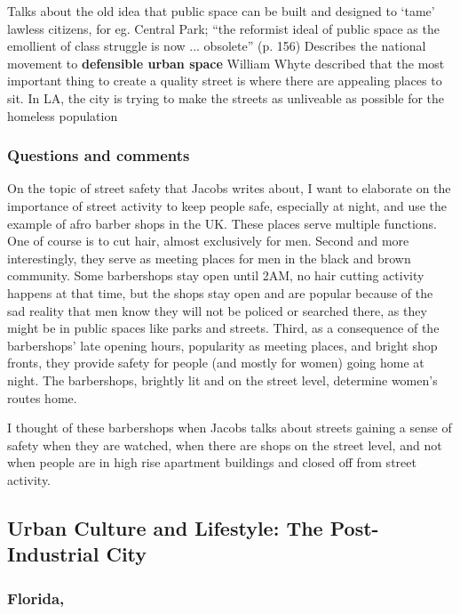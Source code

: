 \documentclass{article}
\begin{document}
\begin{outline}
	\1 Talks about the old idea that public space can be built and designed to `tame' lawless citizens, for eg. Central Park; ``the reformist ideal of public space as the emollient of class struggle is now ... obsolete'' (p. 156)
	\1 Describes the national movement to \textbf{defensible urban space}
	\1 William Whyte described that the most important thing to create a quality street is where there are appealing places to sit. In LA, the city is trying to make the streets as unliveable as possible for the homeless population
\end{outline}

\subsubsection{Questions and comments}

On the topic of street safety that Jacobs writes about, I want to elaborate on the importance of street activity to keep people safe, especially at night, and use the example of afro barber shops in the UK. 
These places serve multiple functions. One of course is to cut hair, almost exclusively for men.
Second and more interestingly, they serve as meeting places for men in the black and brown community. Some barbershops stay open until 2AM, no hair cutting activity happens at that time, but the shops stay open and are popular because of the sad reality that men know they will not be policed or searched there, as they might be in public spaces like parks and streets. 
Third, as a consequence of the barbershops' late opening hours, popularity as meeting places, and bright shop fronts, they provide safety for people (and mostly for women) going home at night. The barbershops, brightly lit and on the street level, determine women's routes home.

I thought of these barbershops when Jacobs talks about streets gaining a sense of safety when they are watched, when there are shops on the street level, and not when people are in high rise apartment buildings and closed off from street activity.

\subsection{Urban Culture and Lifestyle: The Post-Industrial City}

\subsubsection{Florida, \textit{}}
\end{document}
